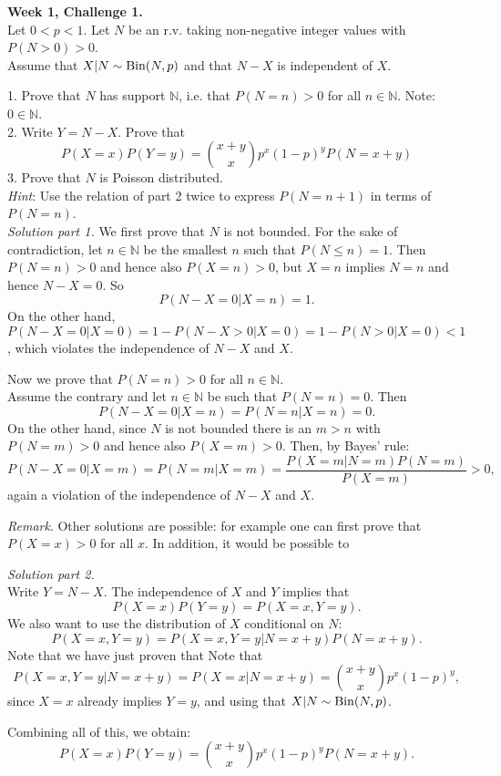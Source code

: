 \documentclass[12pt]{article}
\newcommand{\Bin}{\mathop{\mathgroup\symoperators Bin}\nolimits}
\begin{document}
\textbf{Week 1, Challenge 1.} \\
Let $0 < p < 1$. Let $N$ be an r.v. taking non-negative integer values with $P(N > 0) > 0$. \\
Assume that  $X|N\sim\Bin(N,p)$ and that $N-X$ is independent of $X$.

1. Prove that $N$ has support $\mathbb N$, i.e. that $P(N=n) > 0$ for all $n \in \mathbb N$. Note: $0 \in \mathbb N$. \\
2. Write $Y = N-X$. Prove that
 $$P(X=x)P(Y=y) = \binom{x+y}{x} p^x (1-p)^y P(N=x+y)$$
3. Prove that $N$ is Poisson distributed. \\
 \textit{Hint}: Use the relation of part 2 twice to express $P(N=n+1)$ in terms of $P(N=n)$. \\

\textit{Solution part 1.} We first prove that $N$ is not bounded. For the sake of contradiction, let $n\in \mathbb N$ be the smallest $n$ such that $P(N \leq n) = 1$. Then $P(N=n) > 0$ and hence also $P(X=n) > 0$, but $X=n$ implies $N=n$ and hence $N-X=0$. So $$P(N-X=0|X=n) = 1.$$
On the other hand, $P(N-X=0|X=0) = 1 - P(N-X>0|X=0) =  1- P(N>0|X=0) < 1$, which violates the independence of $N-X$ and $X$.

Now we prove that $P(N=n) > 0$ for all $n \in \mathbb N$. \\
Assume the contrary and let $n\in \mathbb N$ be such that $P(N=n) = 0$.
Then $$P(N-X=0|X=n) = P(N=n|X=n) = 0.$$
On the other hand, since $N$ is not bounded there is an $m > n$ with $P(N=m)>0$ and hence also $P(X=m)>0$. Then, by Bayes' rule: $$P(N-X=0|X=m) = P(N=m|X=m) = \frac{P(X=m|N=m)P(N=m)}{P(X=m)} > 0,$$
again a violation of the independence of $N-X$ and $X$.

\textit{Remark}. Other solutions are possible: for example one can first prove that $P(X=x) > 0$ for all $x$. In addition, it would be possible to

\newpage

\textit{Solution part 2.} \\
Write $Y = N-X$. The independence of $X$ and $Y$ implies that $$P(X=x)P(Y=y) = P(X=x, Y=y).$$
We also want to use the distribution of $X$ conditional on $N$:
$$P(X=x, Y=y) = P(X=x, Y=y|N=x+y)P(N=x+y).$$
Note that we have just proven that
Note that $$P(X=x, Y=y|N=x+y) = P(X=x|N=x+y) = \binom{x+y}{x} p^x (1-p)^y,$$
since $X=x$ already implies $Y=y$, and using that  $X|N\sim\Bin(N,p)$.

Combining all of this, we obtain:
 $$P(X=x)P(Y=y) = \binom{x+y}{x} p^x (1-p)^y P(N=x+y).$$
\end{document}
